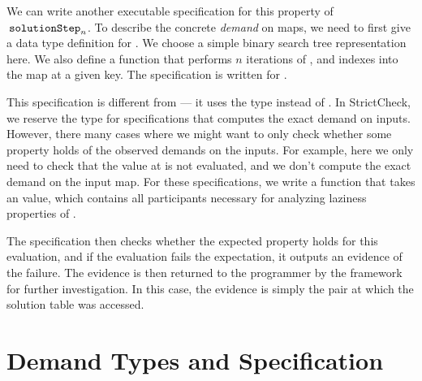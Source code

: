 \documentclass[acmsmall,review]{acmart}\settopmatter{}
\begin{document}
We can write another executable specification for this property of
$\lk{solutionStep}_n$. To describe the concrete \textit{demand} on
maps, we need to first give a data type definition for . We
choose a simple binary search tree representation here. We also define
a function  that performs $n$ iterations
of , and indexes into the map at a given key. The
specification is written for .
%
%
This specification is different from  --- it uses
the  type instead of . In StrictCheck, we
reserve the  type for specifications that computes the exact
demand on inputs. However, there many cases where we might want to
only check whether some property holds of the observed demands on the
inputs. For example, here we only need to check that the value
at  is not evaluated, and we don't compute the exact demand
on the input map. For these specifications, we write a function that
takes an  value, which contains all participants
necessary for analyzing laziness properties of .

The specification then checks whether the expected property holds for
this evaluation, and if the evaluation fails the expectation, it
outputs an evidence of the failure. The evidence is then returned to
the programmer by the framework for further investigation. In this
case, the evidence is simply the  pair at which the
solution table was accessed.

\section{Demand Types and Specification}
\label{sec:demand-types-and-spec}
\end{document}
